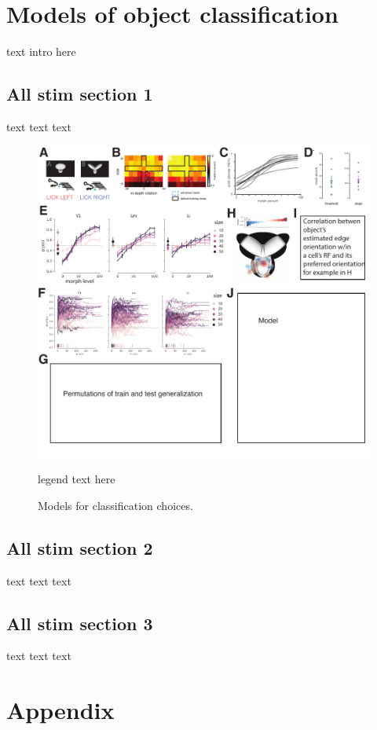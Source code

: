 \documentclass{article}
\begin{document}
\section{Models of object classification}
text intro here

\subsection{All stim section 1}
text text text

\begin{figure}[ht]
  \includegraphics[width=\textwidth]{figures/allstim.pdf}
  \caption{Models for classification choices.}
  \medskip
  \small
  legend text here
  \label{fig:fig5}
\end{figure}

\subsection{All stim section 2}
text text text

\subsection{All stim section 3}
text text text



\section{Appendix}
\end{document}
